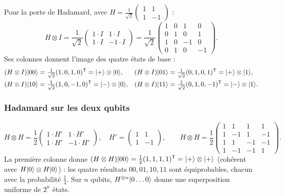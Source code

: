 Pour la porte de Hadamard, avec $H=\frac{1}{\sqrt2}\begin{pmatrix}1 & 1\\ 1 & -1\end{pmatrix}$ :
\[
  H\otimes I=\frac{1}{\sqrt2}\begin{pmatrix}1\cdot I & 1\cdot I\\ 1\cdot I & -1\cdot I\end{pmatrix}
  =\frac{1}{\sqrt2}\begin{pmatrix}1 & 0 & 1 & 0\\ 0 & 1 & 0 & 1\\ 1 & 0 & -1 & 0\\ 0 & 1 & 0 & -1\end{pmatrix}.
\]
Ses colonnes donnent l'image des quatre états de base :
\begin{align*}
  (H\otimes I)|00\rangle&=\tfrac{1}{\sqrt2}(1,0,1,0)^{\mathsf T}=|+\rangle\otimes|0\rangle,&
  (H\otimes I)|01\rangle&=\tfrac{1}{\sqrt2}(0,1,0,1)^{\mathsf T}=|+\rangle\otimes|1\rangle,\\
  (H\otimes I)|10\rangle&=\tfrac{1}{\sqrt2}(1,0,-1,0)^{\mathsf T}=|-\rangle\otimes|0\rangle,&
  (H\otimes I)|11\rangle&=\tfrac{1}{\sqrt2}(0,1,0,-1)^{\mathsf T}=|-\rangle\otimes|1\rangle.
\end{align*}

\subsubsection{Hadamard sur les deux qubits}

\[
  H\otimes H=\frac12\begin{pmatrix}1\cdot H' & 1\cdot H'\\ 1\cdot H' & -1\cdot H'\end{pmatrix},
  \quad H'=\begin{pmatrix}1 & 1\\ 1 & -1\end{pmatrix},
  \qquad
  H\otimes H=\frac12\begin{pmatrix}1 & 1 & 1 & 1\\ 1 & -1 & 1 & -1\\ 1 & 1 & -1 & -1\\ 1 & -1 & -1 & 1\end{pmatrix}.
\]
La première colonne donne $(H\otimes H)|00\rangle=\frac12(1,1,1,1)^{\mathsf T}=|+\rangle\otimes|+\rangle$
(cohérent avec $H|0\rangle\otimes H|0\rangle$) : les quatre résultats $00,01,10,11$ sont
équiprobables, chacun avec la probabilité $\frac14$. Sur $n$ qubits, $H^{\otimes n}|0\ldots0\rangle$
donne une superposition uniforme de $2^n$ états.

